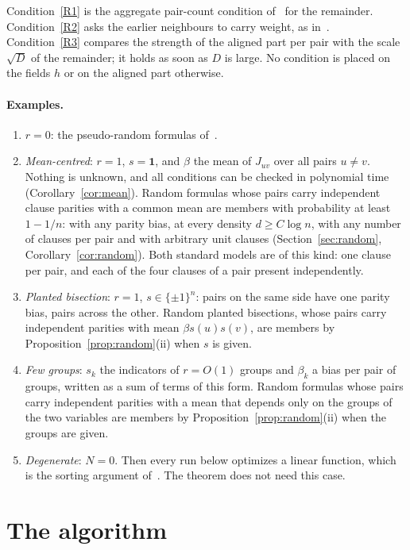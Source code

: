 \documentclass[11pt,a4paper]{article}
\theoremstyle{definition}
\theoremstyle{remark}
\begin{document}
Condition~\eqref{R1} is the aggregate pair-count condition of~\cite{CC} for the
remainder. Condition~\eqref{R2} asks the earlier neighbours to carry weight, as
in~\cite{CA}. Condition~\eqref{R3} compares the strength of the aligned
part per pair with the scale $\sqrt D$ of the remainder; it holds as soon as
$D$ is large. No condition is placed on the fields $h$ or on the aligned part
otherwise.

\paragraph{Examples.}
\begin{enumerate}
 \item $r=0$: the pseudo-random formulas of~\cite{CC,CA}.
 \item \emph{Mean-centred}: $r=1$, $s=\mathbf 1$, and $\beta$ the mean of
 $J_{uv}$ over all pairs $u\ne v$. Nothing is unknown, and all conditions can
 be checked in polynomial time (Corollary~\ref{cor:mean}). Random formulas
 whose pairs carry independent clause parities with a common mean are members
 with probability at least $1-1/n$: with any parity bias, at every density
 $d\ge C\log n$, with any number of clauses per pair and with arbitrary unit
 clauses (Section~\ref{sec:random}, Corollary~\ref{cor:random}). Both standard
 models are of this kind: one clause per pair, and each of the four clauses of
 a pair present independently.
 \item \emph{Planted bisection}: $r=1$, $s\in\{\pm1\}^n$: pairs on the same
 side have one parity bias, pairs across the other. Random planted bisections,
 whose pairs carry independent parities with mean $\beta s(u)s(v)$, are members
 by Proposition~\ref{prop:random}(ii) when $s$ is given.
 \item \emph{Few groups}: $s_k$ the indicators of $r=O(1)$ groups and $\beta_k$
 a bias per pair of groups, written as a sum of terms of this form. Random
 formulas whose pairs carry independent parities with a mean that depends only
 on the groups of the two variables are members by
 Proposition~\ref{prop:random}(ii) when the groups are given.
 \item \emph{Degenerate}: $N=0$. Then every run below optimizes a linear
 function, which is the sorting argument of~\cite[Section~4]{RG}. The
 theorem does not need this case.
\end{enumerate}

\section{The algorithm}\label{sec:algorithm}
\end{document}
